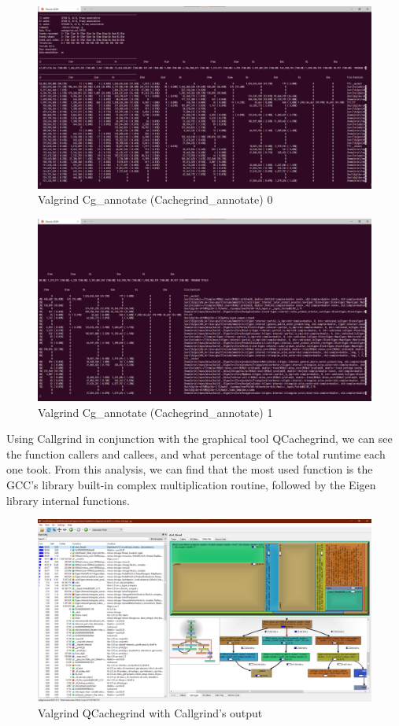 \begin{figure}[H]
    \includegraphics[width=\columnwidth]{figs/valgrind_cg_annotate0}
    \caption{Valgrind Cg\_annotate (Cachegrind\_annotate) 0}
\end{figure}
\begin{figure}[H]
    \includegraphics[width=\columnwidth]{figs/valgrind_cg_annotate1}
    \caption{Valgrind Cg\_annotate (Cachegrind\_annotate) 1}
\end{figure}

Using Callgrind in conjunction with the graphical tool QCachegrind, we can
see the function callers and callees, and what percentage of the total runtime
each one took. From this analysis, we can find that the most used function is
the GCC's library built-in complex multiplication routine, followed by the Eigen
library internal functions.

\begin{figure}[H]
    \includegraphics[width=\columnwidth]{figs/valgrind_qcachegrind_callgrind}
    \caption{Valgrind QCachegrind with Callgrind's output}
\end{figure}


